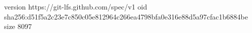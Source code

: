 version https://git-lfs.github.com/spec/v1
oid sha256:d51f5a2c23e7c850c05e812964c266ea4798bfa0e316e88d5a97cfac1b6884be
size 8097
